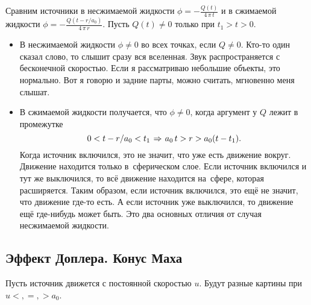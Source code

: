 Сравним источники в несжимаемой жидкости $\phi = -\frac{Q(t)}{4\,\pi\,t}$ и в сжимаемой жидкости $\phi = -\frac{Q(t-r/a_0)}{4\,\pi\,r}$. Пусть $Q(t)\ne0$ только при $t_1>t>0$.
\begin{itemize}
\item В несжимаемой жидкости $\phi\ne0$ во всех точках, если $Q\ne0$. Кто-то один сказал слово, то слышит сразу вся вселенная. Звук распространяется с бесконечной скоростью. Если я рассматриваю небольшие объекты, это нормально. Вот я говорю и задние парты, можно считать, мгновенно меня слышат.
\item  В сжимаемой жидкости получается, что $\phi\ne0$, когда аргумент у $Q$ лежит в промежутке
\[
  0< t - r/a_0<t_1\imp a_0\,t > r > a_0(t-t_1).
\]
Когда источник включился, это не значит, что уже есть движение вокруг. Движение находится только в~сферическом слое. Если источник включился и тут же выключился, то всё движение находится на~сфере, которая расширяется. Таким образом, если источник включился, это ещё не значит, что движение где-то есть. А если источник уже выключился, то движение ещё где-нибудь может быть. Это два основных отличия от случая несжимаемой жидкости.
\end{itemize}

\subsection{Эффект Доплера. Конус Маха}
Пусть источник движется с постоянной скоростью $u$. Будут разные картины при $u<,=,>a_0$.
